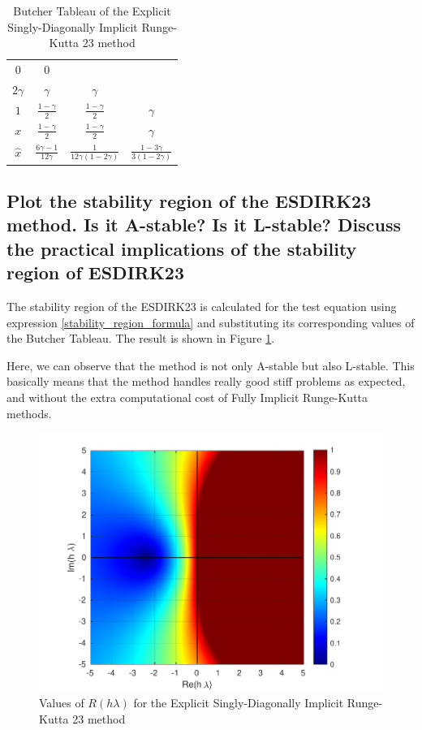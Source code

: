 \begin{table}[H]
\centering
\begin{tabular}{c|ccc}
$0$       & $0$                          &                                 &                                  \\
$2\gamma$ & $\gamma$                     & $\gamma$                        &                                  \\
$1$       & $\frac{1 - \gamma}{2}$       & $\frac{1 - \gamma}{2}$          & $\gamma$                         \\ \hline
$x$       & $\frac{1 - \gamma}{2}$       & $\frac{1 - \gamma}{2}$          & $\gamma$                         \\
$\hat{x}$ & $\frac{6\gamma-1}{12\gamma}$ & $\frac{1}{12\gamma(1-2\gamma)}$ & $\frac{1-3\gamma}{3(1-2\gamma)}$
\end{tabular}
\caption{Butcher Tableau of the Explicit Singly-Diagonally Implicit Runge-Kutta 23 method}
\label{ESDIRK23_Tableau}
\end{table}

\subsection{  Plot  the  stability  region  of  the  ESDIRK23  method.   Is  it  A-stable?   Is it L-stable?  Discuss the practical implications of the stability region of ESDIRK23}
The stability region of the ESDIRK23 is calculated for the test equation using expression \ref{stability_region_formula} and substituting its corresponding values of the Butcher Tableau. The result is shown in Figure \ref{8_2_stability_regions}.

Here, we can observe that the method is not only A-stable but also L-stable. This basically means that the method handles really good stiff problems as expected, and without the extra computational cost of Fully Implicit Runge-Kutta methods.

\begin{figure}[H]
    \centering
    \includegraphics[width=0.7\linewidth]{images/8/8_2_stability_regions.pdf} 
    \caption{Values of $R(h\lambda)$ for the Explicit Singly-Diagonally Implicit Runge-Kutta 23 method}
    \label{8_2_stability_regions}
\end{figure}


